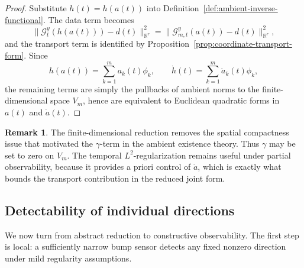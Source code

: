 \documentclass{article}
\theoremstyle{definition}
\newtheorem{remark}[theorem]{Remark}
\begin{document}
\begin{proof}
    Substitute \(h(t)=h(a(t))\) into Definition~\ref{def:ambient-inverse-functional}. The data term
    becomes
    \[
        \|\mathcal G_t^y(h(a(t)))-d(t)\|_{\mathbb R^r}^2
        =
        \|\mathcal G_{m,t}^{y}(a(t))-d(t)\|_{\mathbb R^r}^2,
    \]
    and the transport term is identified by Proposition~\ref{prop:coordinate-transport-form}. Since
    \[
        h(a(t))=\sum_{k=1}^m a_k(t)\phi_k,
        \qquad
        \dot h(t)=\sum_{k=1}^m \dot a_k(t)\phi_k,
    \]
    the remaining terms are simply the pullbacks of ambient norms to the finite-dimensional space
    \(V_m\), hence are equivalent to Euclidean quadratic forms in \(a(t)\) and \(\dot a(t)\).
\end{proof}

\begin{remark}
    \label{rem:reduced-regularization}
    The finite-dimensional reduction removes the spatial compactness issue that motivated the
    \(\gamma\)-term in the ambient existence theory. Thus \(\gamma\) may be set to zero on \(V_m\).
    The temporal \(L^2\)-regularization remains useful under partial observability, because it provides a
    priori control of \(\dot a\), which is exactly what bounds the transport contribution in the reduced
    joint form.
\end{remark}

\subsection{Detectability of individual directions}

We now turn from abstract reduction to constructive observability. The first step is local:
a sufficiently narrow bump sensor detects any fixed nonzero direction under mild regularity
assumptions.
\end{document}

